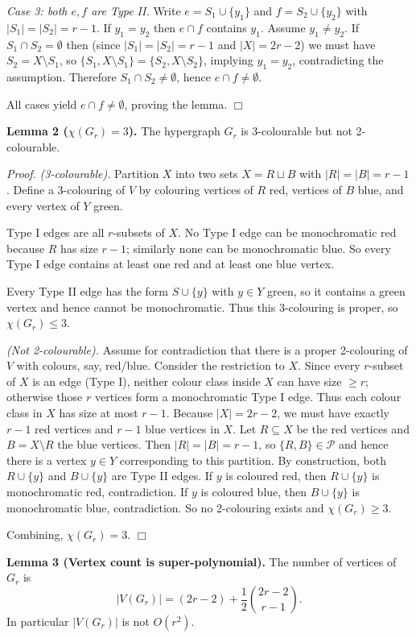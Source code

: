 \emph{Case 3: both $e,f$ are Type II.}
Write $e=S_1\cup\{y_1\}$ and $f=S_2\cup\{y_2\}$ with $|S_1|=|S_2|=r-1$.
If $y_1=y_2$ then $e\cap f$ contains $y_1$.
Assume $y_1\neq y_2$.
If $S_1\cap S_2=\emptyset$ then (since $|S_1|=|S_2|=r-1$ and $|X|=2r-2$) we must have $S_2=X\setminus S_1$, so $\{S_1,X\setminus S_1\}=\{S_2,X\setminus S_2\}$, implying $y_1=y_2$, contradicting the assumption.
Therefore $S_1\cap S_2\neq\emptyset$, hence $e\cap f\neq\emptyset$.

All cases yield $e\cap f\neq\emptyset$, proving the lemma. \hfill$\Box$

\medskip
\noindent\textbf{Lemma 2 ($\chi(G_r)=3$).}
The hypergraph $G_r$ is 3-colourable but not 2-colourable.

\noindent\emph{Proof.}
\emph{(3-colourable).}
Partition $X$ into two sets $X=R\sqcup B$ with $|R|=|B|=r-1$.
Define a 3-colouring of $V$ by colouring vertices of $R$ red, vertices of $B$ blue, and every vertex of $Y$ green.

Type I edges are all $r$-subsets of $X$.
No Type I edge can be monochromatic red because $R$ has size $r-1$; similarly none can be monochromatic blue.
So every Type I edge contains at least one red and at least one blue vertex.

Every Type II edge has the form $S\cup\{y\}$ with $y\in Y$ green, so it contains a green vertex and hence cannot be monochromatic.
Thus this 3-colouring is proper, so $\chi(G_r)\le 3$.

\emph{(Not 2-colourable).}
Assume for contradiction that there is a proper 2-colouring of $V$ with colours, say, red/blue.
Consider the restriction to $X$.
Since every $r$-subset of $X$ is an edge (Type I), neither colour class inside $X$ can have size $\ge r$; otherwise those $r$ vertices form a monochromatic Type I edge.
Thus each colour class in $X$ has size at most $r-1$.
Because $|X|=2r-2$, we must have exactly $r-1$ red vertices and $r-1$ blue vertices in $X$.
Let $R\subseteq X$ be the red vertices and $B=X\setminus R$ the blue vertices.
Then $|R|=|B|=r-1$, so $\{R,B\}\in\mathcal P$ and hence there is a vertex $y\in Y$ corresponding to this partition.
By construction, both $R\cup\{y\}$ and $B\cup\{y\}$ are Type II edges.
If $y$ is coloured red, then $R\cup\{y\}$ is monochromatic red, contradiction.
If $y$ is coloured blue, then $B\cup\{y\}$ is monochromatic blue, contradiction.
So no 2-colouring exists and $\chi(G_r)\ge 3$.

Combining, $\chi(G_r)=3$. \hfill$\Box$

\medskip
\noindent\textbf{Lemma 3 (Vertex count is super-polynomial).}
The number of vertices of $G_r$ is
\[
|V(G_r)|=(2r-2)+\frac12\binom{2r-2}{r-1}.
\]
In particular $|V(G_r)|$ is not $O(r^2)$.

